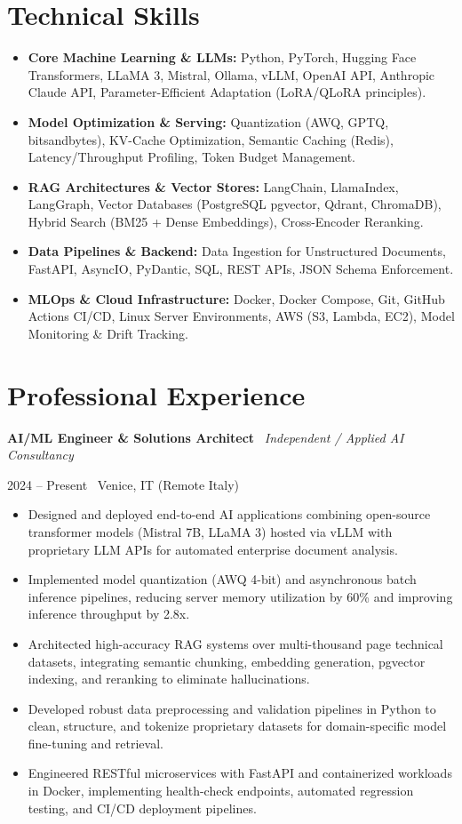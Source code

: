 \documentclass[a4paper,10pt]{article}
\newcommand{\role}[4]{%
  \vspace{2pt}\noindent
  \begin{minipage}[t]{0.70\textwidth}\raggedright\textbf{#1} \textbullet\ \textit{#3}\end{minipage}%
  \hfill
  \begin{minipage}[t]{0.28\textwidth}\raggedleft\footnotesize\color{gray}#2 \textbullet\ #4\end{minipage}%
  \vspace{1pt}%
}
\begin{document}
\section{Technical Skills}
\begin{itemize}[leftmargin=1.2em, itemsep=2pt]
  \item \textbf{Core Machine Learning \& LLMs:} Python, PyTorch, Hugging Face Transformers, LLaMA 3, Mistral, Ollama, vLLM, OpenAI API, Anthropic Claude API, Parameter-Efficient Adaptation (LoRA/QLoRA principles).
  \item \textbf{Model Optimization \& Serving:} Quantization (AWQ, GPTQ, bitsandbytes), KV-Cache Optimization, Semantic Caching (Redis), Latency/Throughput Profiling, Token Budget Management.
  \item \textbf{RAG Architectures \& Vector Stores:} LangChain, LlamaIndex, LangGraph, Vector Databases (PostgreSQL pgvector, Qdrant, ChromaDB), Hybrid Search (BM25 + Dense Embeddings), Cross-Encoder Reranking.
  \item \textbf{Data Pipelines \& Backend:} Data Ingestion for Unstructured Documents, FastAPI, AsyncIO, PyDantic, SQL, REST APIs, JSON Schema Enforcement.
  \item \textbf{MLOps \& Cloud Infrastructure:} Docker, Docker Compose, Git, GitHub Actions CI/CD, Linux Server Environments, AWS (S3, Lambda, EC2), Model Monitoring \& Drift Tracking.
\end{itemize}

\section{Professional Experience}

\role{AI/ML Engineer \& Solutions Architect}{2024 -- Present}{Independent / Applied AI Consultancy}{Venice, IT (Remote Italy)}
\begin{itemize}
  \item Designed and deployed end-to-end AI applications combining open-source transformer models (Mistral 7B, LLaMA 3) hosted via vLLM with proprietary LLM APIs for automated enterprise document analysis.
  \item Implemented model quantization (AWQ 4-bit) and asynchronous batch inference pipelines, reducing server memory utilization by 60\% and improving inference throughput by 2.8x.
  \item Architected high-accuracy RAG systems over multi-thousand page technical datasets, integrating semantic chunking, embedding generation, pgvector indexing, and reranking to eliminate hallucinations.
  \item Developed robust data preprocessing and validation pipelines in Python to clean, structure, and tokenize proprietary datasets for domain-specific model fine-tuning and retrieval.
  \item Engineered RESTful microservices with FastAPI and containerized workloads in Docker, implementing health-check endpoints, automated regression testing, and CI/CD deployment pipelines.
\end{itemize}
\end{document}

